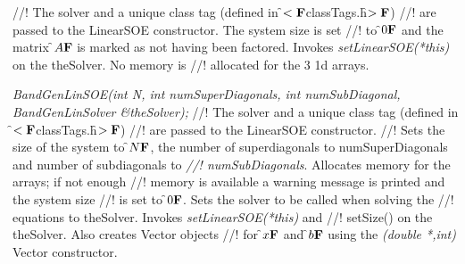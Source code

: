 \indent{}
\indent{}
\indent{}
\indent{}
\indent{}
\indent{}
\indent{}
\indent{}
\indent{}
\indent{}
\indent{}
\indent{}
\indent{}
\indent{}
\indent{}
\indent{}
\indent{}
\indent{}
\indent{} 
\indent{} 


//! The \p solver and a unique class tag (defined in \f$<{\bf F}$classTags.h\f$>{\bf F}$)
//! are passed to the LinearSOE constructor. The system size is set
//! to \f$0{\bf F}$ and the matrix \f$A{\bf F}$ is marked as not having been factored. Invokes
{\em setLinearSOE(*this)} on the \p theSolver. No memory is
//! allocated for the 3 1d arrays.  


{\em BandGenLinSOE(int N, int numSuperDiagonals, int numSubDiagonal,
		  BandGenLinSolver \&theSolver);        }
//! The \p solver and a unique class tag (defined in \f$<{\bf F}$classTags.h\f$>{\bf F}$)
//! are passed to the LinearSOE constructor. 
//! Sets the size of the system to \f$N{\bf F}$, the number of superdiagonals to 
\p numSuperDiagonals and number of subdiagonals to {\em
//! numSubDiagonals}. Allocates memory for the arrays; if not enough
//! memory is available a warning message is printed and the system size
//! is set to \f$0{\bf F}$. Sets the solver to be called when solving the
//! equations to \p theSolver. Invokes {\em setLinearSOE(*this)} and
//! setSize() on the \p theSolver. Also creates Vector objects
//! for \f$x{\bf F}$ and \f$b{\bf F}$ using the {\em (double *,int)} Vector constructor.


